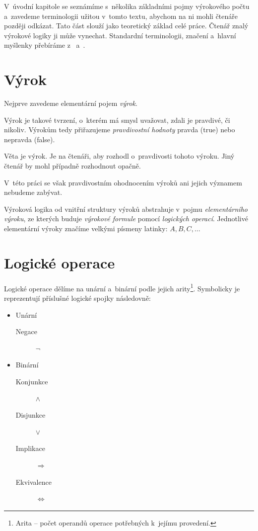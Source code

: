 \documentclass[thesis=B,czech,hidelinks]{thesis}[2012/06/26]
\begin{document}
V~úvodní kapitole se seznámíme s~několika základními pojmy výrokového počtu a~zavedeme terminologii užitou v~tomto textu, abychom na ni mohli čtenáře později odkázat. Tato část slouží jako teoretický základ celé práce. Čtenář znalý výrokové logiky ji může vynechat. Standardní terminologii, značení a~hlavní myšlenky přebíráme z~\cite{sochor} a~\cite{stary}.

\section{Výrok}

Nejprve zavedeme elementární pojem \emph{výrok}.

Výrok je takové tvrzení, o~kterém má smysl uvažovat, zdali je pravdivé, či nikoliv. Výrokům tedy přiřazujeme \emph{pravdivostní hodnoty} pravda (true) nebo nepravda (false).

\begin{exm}
Věta  je výrok. Je na čtenáři, aby rozhodl o~pravdivosti tohoto výroku. Jiný čtenář by mohl případně rozhodnout opačně.
\end{exm}
 
V~této práci se však pravdivostním ohodnocením výroků ani jejich významem nebudeme zabývat.

Výroková logika od vnitřní struktury výroků abstrahuje v~pojmu \emph{elementárního výroku}, ze kterých buduje \emph{výrokové formule} pomocí \emph{logických operací}. Jednotlivé elementární výroky značíme velkými písmeny latinky: $A, B, C, \ldots$

\section{Logické operace}

Logické operace dělíme na unární a~binární podle jejich arity\footnote{Arita -- počet operandů operace potřebných k~jejímu provedení.}. Symbolicky je reprezentují příslušné logické spojky následovně:

\begin{itemize}
	\item Unární
	\begin{description}
		\item[Negace] $\neg$
	\end{description}
	\item Binární
	\begin{description}
		\item[Konjunkce] $\wedge$
		\item[Disjunkce] $\vee$
		\item[Implikace] $\Rightarrow$
		\item[Ekvivalence] $\Leftrightarrow$
	\end{description}
\end{itemize}
\end{document}
